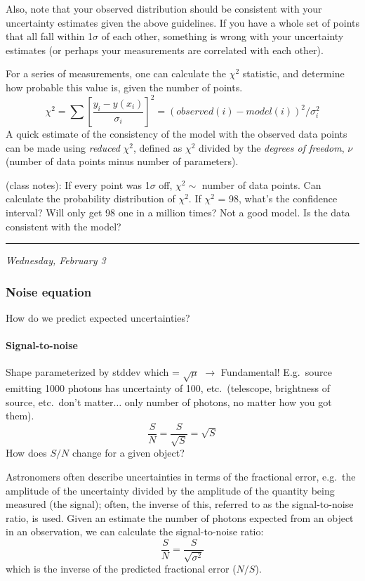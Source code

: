 \documentclass[12pt]{article}
\newcommand{\mynotes}[1]{\textcolor{myBlue}{#1}}
\newcommand{\mydate}[1]{
    \begin{flushright}
        \rule{\textwidth}{0.4pt} %
        \footnotesize\hfill\textit{#1}
    \end{flushright}}
\begin{document}
Also, note that your observed distribution should be consistent with your
uncertainty estimates given the above guidelines. If you have a whole set of
points that all fall within 1$\sigma$ of each other, something is wrong with
your uncertainty estimates (or perhaps your measurements are correlated with
each other).

For a series of measurements, one can calculate the $\chi^{2}$ statistic, and
determine how probable this value is, given the number of points.
\[
    \chi^{2} = \sum \left[ \frac{y_{i} - y(x_{i})}{\sigma_{i}} \right]^{2}
    = (observed(i)-model(i))^{2}/\sigma_i^{2}
    \]
A quick estimate of the consistency of the model with the observed
data points can be made using \textit{reduced} $\chi^{2}$, defined as
$\chi^{2}$ divided by the \textit{degrees of freedom}, $\nu$
(number of data points minus number of parameters).

\mynotes{
(class notes): If every point was 1$\sigma$ off, $\chi^{2} \sim$ number of data
points. Can calculate the probability distribution of $\chi^{2}$. If $\chi^{2}$
= 98, what's the confidence interval? Will only get 98 one in a million times?
Not a good model. Is the data consistent with the model? }

\mydate{Wednesday, February 3}
\subsubsection{Noise equation}
How do we predict expected uncertainties?

\paragraph{Signal-to-noise}
\mynotes{
Shape parameterized by stddev which = $\sqrt{\mu}$
$\rightarrow$ Fundamental! E.g.\ source emitting 1000 photons has
uncertainty of 100, etc.\ (telescope, brightness of source, etc.\ don't
matter$\ldots$ only number of photons, no matter how you got them).
\[
    \frac{S}{N} = \frac{S}{\sqrt{S}} = \sqrt{S}
    \]
How does $S/N$ change for a given object? }

Astronomers often describe uncertainties in terms of the fractional
error, e.g.\ the amplitude of the uncertainty divided by the amplitude
of the quantity being measured (the signal);
often, the inverse of this, referred
to as the signal-to-noise ratio, is used. Given an estimate the number
of photons expected from an object in an observation, we can calculate
the signal-to-noise ratio:
\[
    \frac{S}{N} = \frac{S}{\sqrt{\sigma^{2}}} 
    \]
which is the inverse of the predicted fractional error ($N/S$).
\end{document}
